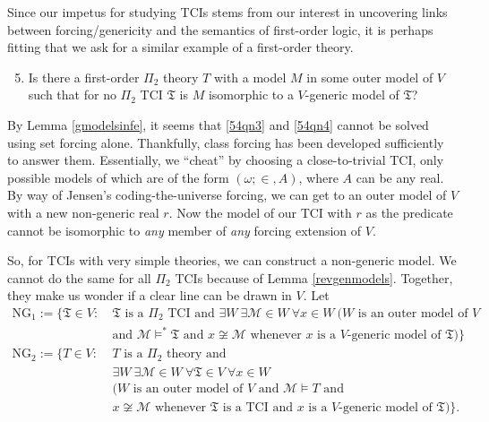 \documentclass[12pt]{article}
\numberwithin{equation}{section}
\begin{document}
Since our impetus for studying TCIs stems from our interest in uncovering links between forcing/genericity and the semantics of first-order logic, it is perhaps fitting that we ask for a similar example of a first-order theory. 

\begin{enumerate}[label=(Q\arabic*)]
    \setcounter{enumi}{4}
    \item\label{54qn4} Is there a first-order $\Pi_2$ theory $T$ with a model $M$ in some outer model of $V$ such that for no $\Pi_2$ TCI $\mathfrak{T}$ is $M$ isomorphic to a $V$-generic model of $\mathfrak{T}$?
\end{enumerate}

By Lemma \ref{gmodelsinfe}, it seems that \ref{54qn3} and \ref{54qn4} cannot be solved using set forcing alone. Thankfully, class forcing has been developed sufficiently to answer them. Essentially, we ``cheat'' by choosing a close-to-trivial TCI, only possible models of which are of the form $(\omega; \in, A)$, where $A$ can be any real. By way of Jensen's coding-the-universe forcing, we can get to an outer model of $V$ with a new non-generic real $r$. Now the model of our TCI with $r$ as the predicate cannot be isomorphic to \emph{any} member of \emph{any} forcing extension of $V$. 

So, for TCIs with very simple theories, we can construct a non-generic model. We cannot do the same for all $\Pi_2$ TCIs because of Lemma \ref{revgenmodels}. Together, they make us wonder if a clear line can be drawn in $V$. Let 
\begin{align*}
    \mathrm{NG}_1 := \{\mathfrak{T} \in V : \ & \mathfrak{T} \text{ is a } \Pi_2 \text{ TCI and } \exists W \ \exists \mathcal{M} \! \in \! W \ \forall x \! \in \! W \ (W \text{ is an outer model of } V \\
    & \text{and } \mathcal{M} \models^* \mathfrak{T} \text{ and } x \not\cong \mathcal{M} \text{ whenever } x \text{ is a } V \text{-generic model of } \mathfrak{T})\} \\
    \mathrm{NG}_2 := \{T \in V : \ & T \text{ is a } \Pi_2 \text{ theory and } \\
    & \exists W \ \exists \mathcal{M} \! \in \! W \ \forall \mathfrak{T} \! \in \! V \ \forall x \! \in \! W \\
    & (W \text{ is an outer model of } V \text{ and } \mathcal{M} \models T \text{ and } \\
    & x \not\cong \mathcal{M} \text{ whenever } \mathfrak{T} \text{ is a TCI and } x \text{ is a } V \text{-generic model of } \mathfrak{T})\} \text{.}
\end{align*}
\end{document}
